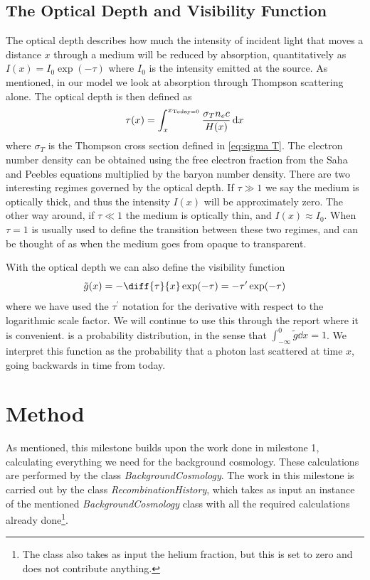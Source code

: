 \documentclass[10pt,a4paper]{article}
\begin{document}
\subsection{The Optical Depth and Visibility Function}
\label{subsec:Theory/tau and g}
The optical depth describes how much the intensity of incident light that moves a distance $x$ through a medium will be reduced by absorption, quantitatively as $I(x) = I_0 \exp(-\tau)$ where $I_0$ is the intensity emitted at the source. As mentioned, in our model we look at absorption through Thompson scattering alone. The optical depth is then defined as
\begin{equation}
    \tau(x) = \int_x^{x_{\rm{Today}=0}} \frac{\sigma_T n_e c}{H(x)}\dd{x}
    \label{eq:tau integration}
\end{equation}
where $\sigma_T$ is the Thompson cross section defined in \cref{eq:sigma T}. The electron number density can be obtained using the free electron fraction from the Saha and Peebles equations multiplied by the baryon number density. There are two interesting regimes governed by the optical depth. If $\tau \gg 1$ we say the medium is optically thick, and thus the intensity $I(x)$ will be approximately zero. The other way around, if $\tau \ll 1$ the medium is optically thin, and $I(x) \approx I_0$. When $\tau  = 1$ is usually used to define the transition between these two regimes, and can be thought of as when the medium goes from opaque to transparent.

With the optical depth we can also define the visibility function
\begin{equation}
    \tilde{g}(x) = - \diff{\tau}{x}\exp(-\tau) = -\tau^\prime \exp(-\tau)
    \label{eq:visibility function}
\end{equation}
where we have used the $\tau^\prime$ notation for the derivative with respect to the logarithmic scale factor. We will continue to use this through the report where it is convenient.  is a probability distribution, in the sense that $\int_{-\infty}^0 \tilde{g}\dd x = 1$. We interpret this function as the probability that a photon last scattered at time $x$, going backwards in time from today.

\section{Method}
\label{sec:Method}
As mentioned, this milestone builds upon the work done in milestone 1\citep{milestone1}, calculating everything we need for the background cosmology. These calculations are performed by the class \textit{BackgroundCosmology}. The work in this milestone is carried out by the class \textit{RecombinationHistory}, which takes as input an instance of the mentioned \textit{BackgroundCosmology} class with all the required calculations already done\footnote{The class also takes as input the helium fraction, but this is set to zero and does not contribute anything.}.
\end{document}
